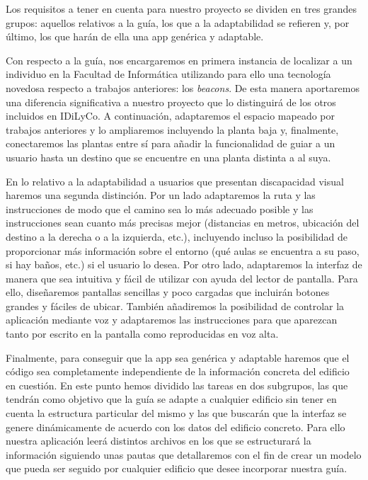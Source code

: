 Los requisitos a tener en cuenta para nuestro proyecto se dividen en tres grandes grupos: aquellos relativos a la guía, los que a la adaptabilidad se refieren y, por último, los que harán de ella una app genérica y adaptable.

Con respecto a la guía, nos encargaremos en primera instancia de localizar a un individuo en la Facultad de Informática utilizando para ello una tecnología novedosa respecto a trabajos anteriores: los \textit{beacons}. De esta manera aportaremos una diferencia significativa a nuestro proyecto que lo distinguirá de los otros incluidos en IDiLyCo. A continuación, adaptaremos el espacio mapeado por trabajos anteriores y lo ampliaremos incluyendo la planta baja y, finalmente, conectaremos las plantas entre sí para añadir la funcionalidad de guiar a un usuario hasta un destino que se encuentre en una planta distinta a al suya.

En lo relativo a la adaptabilidad a usuarios que presentan discapacidad visual haremos una segunda distinción. Por un lado adaptaremos la ruta y las instrucciones de modo que el camino sea lo más adecuado posible y las instrucciones sean cuanto más precisas mejor (distancias en metros, ubicación del destino a la derecha o a la izquierda, etc.), incluyendo incluso la posibilidad de proporcionar más información sobre el entorno (qué aulas se encuentra a su paso, si hay baños, etc.) si el usuario lo desea. Por otro lado, adaptaremos la interfaz de manera que sea intuitiva y fácil de utilizar con ayuda del lector de pantalla. Para ello, diseñaremos pantallas sencillas y poco cargadas que incluirán botones grandes y fáciles de ubicar. También añadiremos la posibilidad de controlar la aplicación mediante voz y adaptaremos las instrucciones para que aparezcan tanto por escrito en la pantalla como reproducidas en voz alta.

Finalmente, para conseguir que la app sea genérica y adaptable haremos que el código sea completamente independiente de la información concreta del edificio en cuestión. En este punto hemos dividido las tareas en dos subgrupos, las que tendrán como objetivo que la guía se adapte a cualquier edificio sin tener en cuenta la estructura particular del mismo y las que buscarán que la interfaz se genere dinámicamente de acuerdo con los datos del edificio concreto. Para ello nuestra aplicación leerá distintos archivos en los que se estructurará la información siguiendo unas pautas que detallaremos con el fin de crear un modelo que pueda ser seguido por cualquier edificio que desee incorporar nuestra guía.

